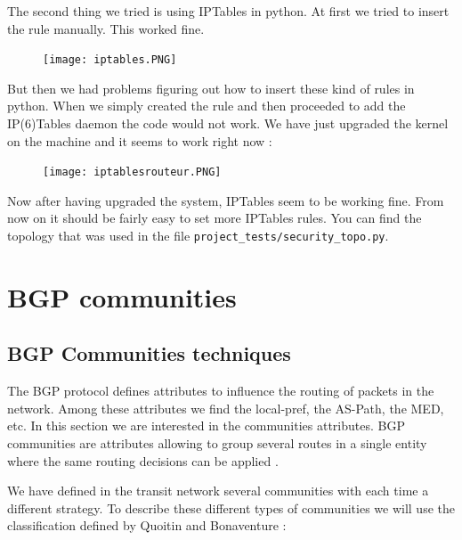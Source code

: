 \documentclass[letter, 9pt, conference]{ieeeconf}
\begin{document}
The second thing we tried is using IPTables in python. At first we tried to insert the rule manually. This worked fine.
\begin{figure}[H]
    \centering
    \texttt{[image: iptables.PNG]}
    \caption{}
\end{figure}

But then we had problems figuring out how to insert these kind of rules in python. When we simply created the rule and then proceeded to add the IP(6)Tables daemon the code would not work. We have just upgraded the kernel on the machine and it seems to work right now : 
\begin{figure}[H]
    \centering
    \texttt{[image: iptablesrouteur.PNG]}
    \caption{}
\end{figure}

Now after having upgraded the system, IPTables seem to be working fine. From now on it should be fairly easy to set more IPTables rules. You can find the topology that was used in the file \texttt{project\_tests/security\_topo.py}.


\section{BGP communities}
\label{sec:communities}

\subsection{BGP Communities techniques}

 The BGP protocol defines attributes to influence the routing of packets in the network. Among these attributes we find the local-pref, the AS-Path, the MED, etc. In this section we are interested in the communities attributes. BGP communities are attributes allowing to group several routes in a single entity where the same routing decisions can be applied \cite{obo_communities}.

We have defined in the transit network several communities with each time a different strategy. To describe these different types of communities we will use the classification defined by Quoitin and Bonaventure \cite{obo_quoitin}:
\end{document}
